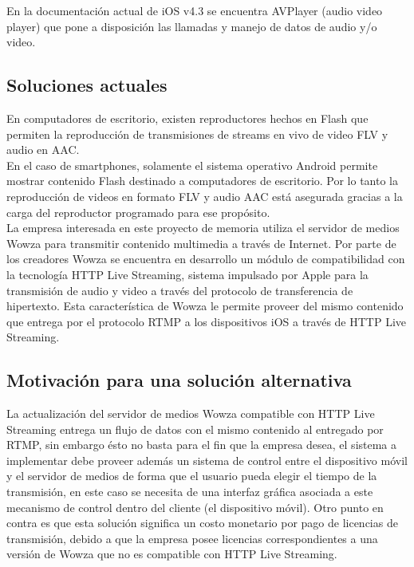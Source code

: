 En la documentación actual de iOS v4.3 se encuentra AVPlayer (audio video player) \cite{bib:avplayer-periodic} que pone a disposición las llamadas y manejo de datos de audio y/o video.


\subsection{Soluciones actuales}
En computadores de escritorio, existen reproductores hechos en Flash que permiten la reproducción de transmisiones de streams en vivo de video FLV y audio en AAC.\\

	En el caso de smartphones, solamente el sistema operativo Android permite mostrar contenido Flash destinado a computadores de escritorio. Por lo tanto la reproducción de videos en formato FLV y audio AAC está asegurada gracias a la carga del reproductor programado para ese propósito.\\

La empresa interesada en este proyecto de memoria utiliza el servidor de medios Wowza \cite{cap1:wowzamediaserver} para transmitir contenido multimedia a través de Internet. Por parte de los creadores Wowza se encuentra en desarrollo un módulo de compatibilidad con la tecnología HTTP Live Streaming, sistema impulsado por Apple para la transmisión de audio y video a través del protocolo de transferencia de hipertexto. Esta característica de Wowza le permite proveer del mismo contenido que entrega por el protocolo RTMP a los dispositivos iOS a través de HTTP Live Streaming.

\subsection{Motivación para una solución alternativa}
La actualización del servidor de medios Wowza compatible con HTTP Live Streaming entrega un flujo de datos con el mismo contenido al entregado por RTMP, sin embargo ésto no basta para el fin que la empresa desea, el sistema a implementar debe proveer además un sistema de control entre el dispositivo móvil y el servidor de medios de forma que el usuario pueda elegir el tiempo de la transmisión, en este caso se necesita de una interfaz gráfica asociada a este mecanismo de control dentro del cliente (el dispositivo móvil). Otro punto en contra es que esta solución significa un costo monetario por pago de licencias de transmisión, debido a que la empresa posee licencias correspondientes a una versión de Wowza que no es compatible con HTTP Live Streaming. \\

